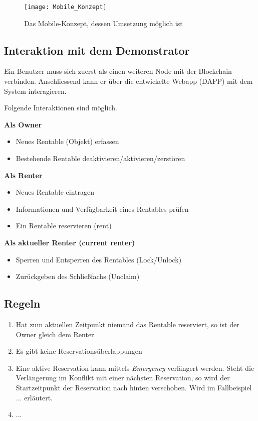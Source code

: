 \begin{figure}
\centering
\texttt{[image: Mobile\_Konzept]}
\caption{Das Mobile-Konzept, dessen Umsetzung möglich ist}
\label{fig:Mobile_Konzept}
\end{figure}

\subsection{Interaktion mit dem Demonstrator}
\label{sec:Interaktion mit dem Demonstrator}

Ein Benutzer muss sich zuerst als einen weiteren Node mit der Blockchain verbinden. Anschliessend kann er über die entwickelte Webapp (DAPP) mit dem System interagieren. 

\vspace{1em}\noindent
Folgende Interaktionen sind möglich.

\vspace{1em}\noindent
\textbf{Als Owner}
\begin{itemize}
    \item Neues Rentable (Objekt) erfassen
    \item Bestehende Rentable deaktivieren/aktivieren/zerstören
\end{itemize}

\vspace{1em}\noindent
\textbf{Als Renter}
\begin{itemize}
    \item Neues Rentable eintragen
    \item Informationen und Verfügbarkeit eines Rentables prüfen
    \item Ein Rentable reservieren (rent)
\end{itemize}

\vspace{1em}\noindent
\textbf{Als aktueller Renter (current renter)}
\begin{itemize}
    \item Sperren und Entsperren des Rentables (Lock/Unlock)
    \item Zurückgeben des Schließfachs (Unclaim)
\end{itemize}

\subsection{Regeln}
\begin{enumerate}
    \item Hat zum aktuellen Zeitpunkt niemand das Rentable reserviert, so ist der Owner gleich dem Renter.
    \item Es gibt keine Reservationsüberlappungen
    \item Eine aktive Reservation kann mittels \emph{Emergency} verlängert werden. Steht die Verlängerung im Konflikt mit einer nächsten Reservation, so wird der Startzeitpunkt der Reservation nach hinten verschoben. Wird im Fallbeispiel ... erläutert.
    \item ...
\end{enumerate}


